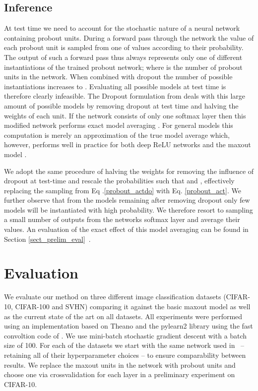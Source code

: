 \documentclass{article} \pdfoutput=1
\begin{document}
\subsection{Inference}
\label{sect_inference}
At test time we need to account for the stochastic nature of a neural
network containing probout units. During a forward pass through the
network the value of each probout unit is sampled from one of 
values according to their probability. The output of such a forward
pass thus always represents only one of  different instantiations
of the trained probout network; where  is the number of probout
units in the network. When combined with dropout the number of
possible instantiations increases to . Evaluating all
possible models at test time is therefore clearly infeasible. The
Dropout formulation from \cite{Hinton2012} deals with this large amount of
possible models by removing dropout at test time and halving the
weights of each unit. If the network consists of only one softmax layer
then this modified network performs exact model averaging
\cite{Hinton2012}.  For general models this computation is merely
an approximation of the true model average which, however, performs
well in practice for both deep ReLU networks \cite{Krizhevsky2012} and
the maxout model \cite{Goodfellow2013}.

We adopt the same procedure of halving the weights for removing the
influence of dropout at test-time and rescale the probabilities such
that  and , effectively replacing the
sampling from Eq .\eqref{probout_actdo} with
Eq. \eqref{probout_act}. We further observe that from the  models
remaining after removing dropout only few models will be instantiated
with high probability. We therefore resort to sampling a small number
of outputs  from the networks softmax layer and average
their values. An evaluation of the exact effect of this
model averaging can be found in Section \ref{sect_prelim_eval}~.

\section{Evaluation}
We evaluate our method on three different image classification
datasets (CIFAR-10, CIFAR-100 and SVHN) comparing it against the basic
maxout model as well as the current state of the art on all
datasets. All experiments were performed using an implementation based
on Theano and the pylearn2 library \cite{GoodfellowPylearn} using the
fast convoltion code of \cite{Krizhevsky2012}. We use mini-batch
stochastic gradient descent with a batch size of 100. For each of the
datasets we start with the same network used in
\cite{Goodfellow2013}~-- retaining all of their hyperparameter
choices -- to ensure comparability between results. We replace the
maxout units in the network with probout units and choose one
 via crossvalidation for each layer  in a preliminary
experiment on CIFAR-10.
\end{document}
